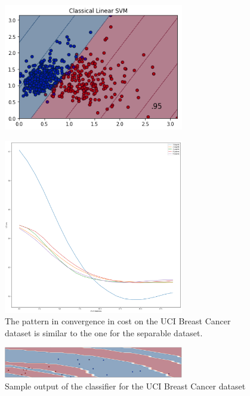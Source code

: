 \documentclass{beamer}
\newcommand\0{\mathbf{0}}
\newcommand\<{\langle}
\renewcommand\>{\rangle}
\begin{document}
\begin{frame}
\begin{figure}[H]
\centering
\includegraphics[width=0.7\textwidth]{images/breast_cancer_linear_svm}	
\end{figure}
\end{frame}

\begin{frame}
\begin{figure}[H]
\centering
\includegraphics[width=0.7\textwidth]{images/breast_cancer_layers}	
\caption{The pattern in convergence in cost on the UCI Breast Cancer dataset is similar to the one for the separable dataset.}
\end{figure}
\end{frame}

\begin{frame}
\begin{figure}[H]
\centering
\includegraphics[width=0.7\textwidth]{images/practical_data_landscape}
\caption{Sample output of the classifier for the UCI Breast Cancer dataset}
\end{figure}
\end{frame}
\end{document}
